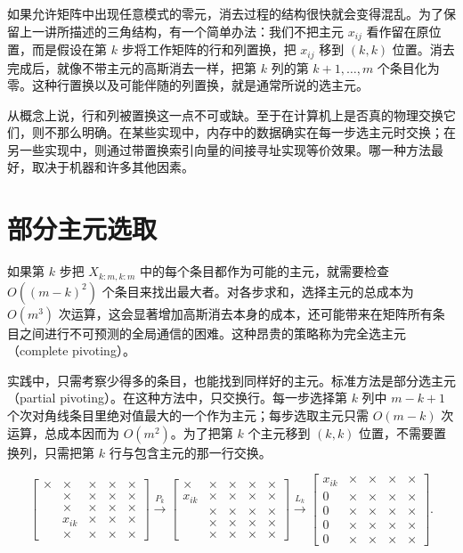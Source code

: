 \documentclass[UTF8,fontset=none,12pt]{ctexart}
\theoremstyle{definition}
\begin{document}
如果允许矩阵中出现任意模式的零元，消去过程的结构很快就会变得混乱。为了保留上一讲所描述的三角结构，有一个简单办法：我们不把主元 $x_{ij}$ 看作留在原位置，而是假设在第 $k$ 步将工作矩阵的行和列置换，把 $x_{ij}$ 移到 $(k,k)$ 位置。消去完成后，就像不带主元的高斯消去一样，把第 $k$ 列的第 $k+1,\ldots,m$ 个条目化为零。这种行置换以及可能伴随的列置换，就是通常所说的选主元。

从概念上说，行和列被置换这一点不可或缺。至于在计算机上是否真的物理交换它们，则不那么明确。在某些实现中，内存中的数据确实在每一步选主元时交换；在另一些实现中，则通过带置换索引向量的间接寻址实现等价效果。哪一种方法最好，取决于机器和许多其他因素。

\section*{部分主元选取}

如果第 $k$ 步把 $X_{k:m,k:m}$ 中的每个条目都作为可能的主元，就需要检查 $O((m-k)^2)$ 个条目来找出最大者。对各步求和，选择主元的总成本为 $O(m^3)$ 次运算，这会显著增加高斯消去本身的成本，还可能带来在矩阵所有条目之间进行不可预测的全局通信的困难。这种昂贵的策略称为完全选主元（complete pivoting）。

实践中，只需考察少得多的条目，也能找到同样好的主元。标准方法是部分选主元（partial pivoting）。在这种方法中，只交换行。每一步选择第 $k$ 列中 $m-k+1$ 个次对角线条目里绝对值最大的一个作为主元；每步选取主元只需 $O(m-k)$ 次运算，总成本因而为 $O(m^2)$。为了把第 $k$ 个主元移到 $(k,k)$ 位置，不需要置换列，只需把第 $k$ 行与包含主元的那一行交换。

\begin{equation*}
\begin{bmatrix}
\times&\times&\times&\times&\times\\
&\times&\times&\times&\times\\
&\times&\times&\times&\times\\
&x_{ik}&\bm{\times}&\bm{\times}&\bm{\times}\\
&\times&\times&\times&\times
\end{bmatrix}
\xrightarrow{P_k}
\begin{bmatrix}
\times&\times&\times&\times&\times\\
x_{ik}&\bm{\times}&\bm{\times}&\bm{\times}&\bm{\times}\\
&\times&\times&\times&\times\\
&\times&\times&\times&\times\\
&\times&\times&\times&\times
\end{bmatrix}
\xrightarrow{L_k}
\begin{bmatrix}
x_{ik}&\bm{\times}&\bm{\times}&\bm{\times}&\bm{\times}\\
0&\bm{\times}&\bm{\times}&\bm{\times}&\bm{\times}\\
0&\bm{\times}&\bm{\times}&\bm{\times}&\bm{\times}\\
0&\bm{\times}&\bm{\times}&\bm{\times}&\bm{\times}\\
0&\bm{\times}&\bm{\times}&\bm{\times}&\bm{\times}
\end{bmatrix}.
\end{equation*}
\end{document}
